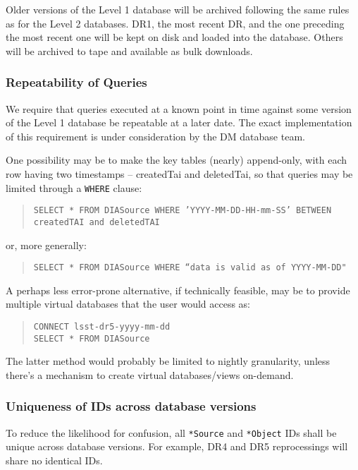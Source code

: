 \documentclass[12pt]{article}
\newcommand{\code}[1]{\texttt{#1}}
\newcommand{\DB}{{Level 1 database}\xspace}
\newcommand{\DR}{{Level 2 database}\xspace}
\begin{document}
Older versions of the \DB will be archived following the same rules as for the \DR{}s. DR1, the most recent DR, and the one preceding the most recent one will be kept on disk and loaded into the database. Others will be archived to tape and available as bulk downloads.

\subsubsection{Repeatability of Queries}

We require that queries executed at a known point in time against some version of the \DB be repeatable at a later date. The exact implementation of this requirement is under consideration by the DM database team.

One possibility may be to make the key tables (nearly) append-only, with each row having two timestamps -- createdTai and deletedTai, so that queries may be limited through a \code{WHERE} clause:

\begin{quote}
\texttt{SELECT * FROM DIASource WHERE 'YYYY-MM-DD-HH-mm-SS' BETWEEN createdTAI and deletedTAI}
\end{quote}

or, more generally:

\begin{quote}
\code{SELECT * FROM DIASource WHERE ``data is valid as of YYYY-MM-DD"}
\end{quote}

A perhaps less error-prone alternative, if technically feasible, may be to provide multiple virtual databases that the user would access as:

\begin{quote}
\texttt{CONNECT lsst-dr5-yyyy-mm-dd} \\
\texttt{SELECT * FROM DIASource}
\end{quote}

The latter method would probably be limited to nightly granularity, unless there's a mechanism to create virtual databases/views on-demand.

\subsubsection{Uniqueness of IDs across database versions}

To reduce the likelihood for confusion, all \texttt{*Source} and \texttt{*Object}  IDs shall be unique across database versions. For example, DR4 and DR5 reprocessings will share no identical IDs. 
\end{document}
